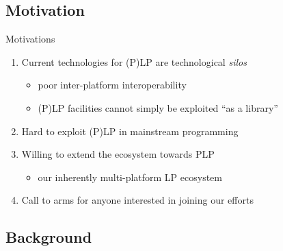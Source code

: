 \documentclass[presentation]{beamer}\mode<presentation>{\usetheme{AMSBolognaFC}}
\begin{document}
\subsection{Motivation}

\begin{frame}[c]{Motivations}

    \begin{enumerate}
        \item Current technologies for (P)LP are \alert{technological \emph{silos}}
        \begin{itemize}
            \item poor \alert{inter-platform} interoperability
            \item (P)LP facilities cannot simply be exploited \alert{``as a library''}
        \end{itemize}

        \bigskip

        \item Hard to exploit (P)LP in \alert{mainstream} programming

        \bigskip

        \item Willing to extend the \alert{\twopkt{}} ecosystem towards PLP
        \begin{itemize}
            \item our \alert{inherently multi-platform} LP ecosystem
        \end{itemize}

        \bigskip

        \item \alert{Call to arms} for anyone interested in joining our efforts

    \end{enumerate}

\end{frame}

\subsection{Background}
\end{document}
